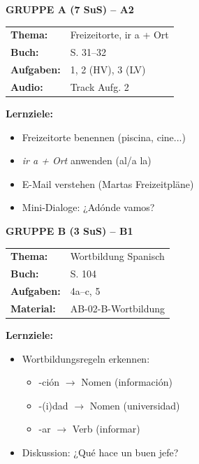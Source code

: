 \documentclass[11pt, a4paper]{article}
\begin{document}
\begin{minipage}[t]{0.48\textwidth}
\textbf{\textcolor{gruppeA}{GRUPPE A (7 SuS) -- A2}}\\[0.2cm]
\begin{tabular}{@{}ll@{}}
\textbf{Thema:} & Freizeitorte, ir a + Ort \\
\textbf{Buch:} & S. 31--32 \\
\textbf{Aufgaben:} & 1, 2 (HV), 3 (LV) \\
\textbf{Audio:} & Track Aufg. 2 \\
\end{tabular}

\vspace{0.3cm}

\textbf{Lernziele:}
\begin{itemize}
\item Freizeitorte benennen (piscina, cine...)
\item \textit{ir a + Ort} anwenden (al/a la)
\item E-Mail verstehen (Martas Freizeitpläne)
\item Mini-Dialoge: ¿Adónde vamos?
\end{itemize}
\end{minipage}
\hfill
\begin{minipage}[t]{0.48\textwidth}
\textbf{\textcolor{gruppeB}{GRUPPE B (3 SuS) -- B1}}\\[0.2cm]
\begin{tabular}{@{}ll@{}}
\textbf{Thema:} & Wortbildung Spanisch \\
\textbf{Buch:} & S. 104 \\
\textbf{Aufgaben:} & 4a--c, 5 \\
\textbf{Material:} & AB-02-B-Wortbildung \\
\end{tabular}

\vspace{0.3cm}

\textbf{Lernziele:}
\begin{itemize}
\item Wortbildungsregeln erkennen:
  \begin{itemize}
  \footnotesize
  \item[-] -ción $\rightarrow$ Nomen (información)
  \item[-] -(i)dad $\rightarrow$ Nomen (universidad)
  \item[-] -ar $\rightarrow$ Verb (informar)
  \end{itemize}
\item Diskussion: ¿Qué hace un buen jefe?
\end{itemize}
\end{minipage}
\end{document}
